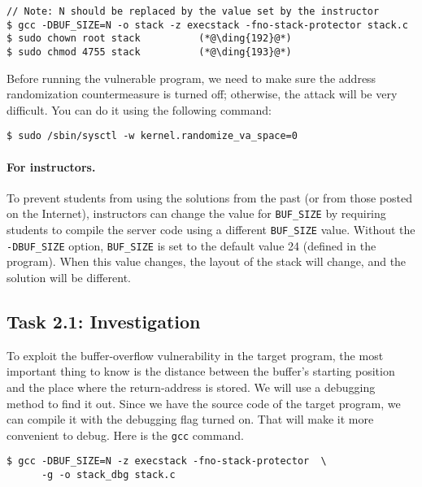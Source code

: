 \begin{lstlisting}
// Note: N should be replaced by the value set by the instructor
$ gcc -DBUF_SIZE=N -o stack -z execstack -fno-stack-protector stack.c
$ sudo chown root stack          (*@\ding{192}@*)
$ sudo chmod 4755 stack          (*@\ding{193}@*)
\end{lstlisting}


Before running the vulnerable program, we need to make sure the 
address randomization countermeasure is turned off; otherwise, the 
attack will be very difficult. 
You can do it using the following command:

\begin{lstlisting}
$ sudo /sbin/sysctl -w kernel.randomize_va_space=0
\end{lstlisting}

 

\paragraph{For instructors.}
To prevent students from using the solutions from the past (or from those
posted on the Internet), instructors can change the
value for \texttt{BUF\_SIZE} by requiring students to compile the
server code using a different \texttt{BUF\_SIZE} value.
Without the \texttt{-DBUF\_SIZE}
option, \texttt{BUF\_SIZE} is set to the default value 24 (defined
in the program).
When this value changes, the layout of the stack
will change, and the solution will be different.


\subsection{Task 2.1: Investigation} 

To exploit the buffer-overflow vulnerability in the target program,
the most important thing to know is the distance between the 
buffer's starting position and the place where the return-address
is stored. We will use a debugging method to find it out.
Since we have the source code of the target program, we
can compile it with the debugging flag turned on. That will make it more
convenient to debug. Here is the \texttt{gcc} command.

\begin{lstlisting}
$ gcc -DBUF_SIZE=N -z execstack -fno-stack-protector  \
      -g -o stack_dbg stack.c
\end{lstlisting}

